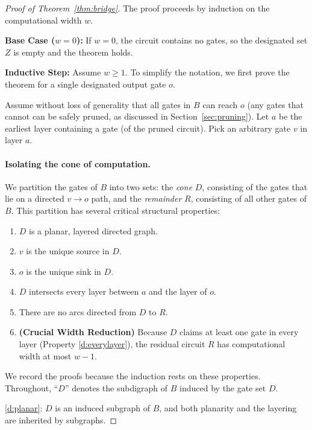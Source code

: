 \documentclass[11pt]{article}
\theoremstyle{definition}
\theoremstyle{remark}
\begin{document}
\begin{proof}[Proof of Theorem~\ref{thm:bridge}]
The proof proceeds by induction on the computational width $w$.

\textbf{Base Case ($w=0$):} If $w=0$, the circuit contains no gates, so the designated set $Z$ is empty and the theorem holds.

\textbf{Inductive Step:} Assume $w \ge 1$. To simplify the notation, we first prove the theorem for a single designated output gate $o$.

Assume without loss of generality that all gates in $B$ can reach $o$ (any gates that cannot can be safely pruned, as discussed in Section~\ref{sec:pruning}). Let $a$ be the earliest layer containing a gate (of the pruned circuit). Pick an arbitrary gate $v$ in layer $a$.

\paragraph{Isolating the cone of computation.}

We partition the gates of $B$ into two sets: the \emph{cone} $D$, consisting of the gates
that lie on a directed $v\to o$ path, and the \emph{remainder} $R$, consisting of all
other gates of $B$. This partition has several critical structural properties:

\begin{enumerate}[label=(D\arabic*)]
\item\label{d:planar} $D$ is a planar, layered directed graph.
\item\label{d:source} $v$ is the unique source in $D$.
\item\label{d:sink} $o$ is the unique sink in $D$.
\item\label{d:everylayer} $D$ intersects every layer between $a$ and the layer of $o$.
\item\label{d:noexit} There are no arcs directed from $D$ to $R$.
\item\label{d:width} \textbf{(Crucial Width Reduction)} Because $D$ claims at least one gate in every layer (Property \ref{d:everylayer}), the residual circuit $R$ has computational width at most $w-1$.
\end{enumerate}

We record the proofs because the induction rests on these properties.
Throughout, ``$D$'' denotes the subdigraph of $B$ induced by the gate set $D$.

\ref{d:planar}: $D$ is an induced subgraph of $B$, and both planarity and the
layering are inherited by subgraphs.


\end{proof}
\end{document}
